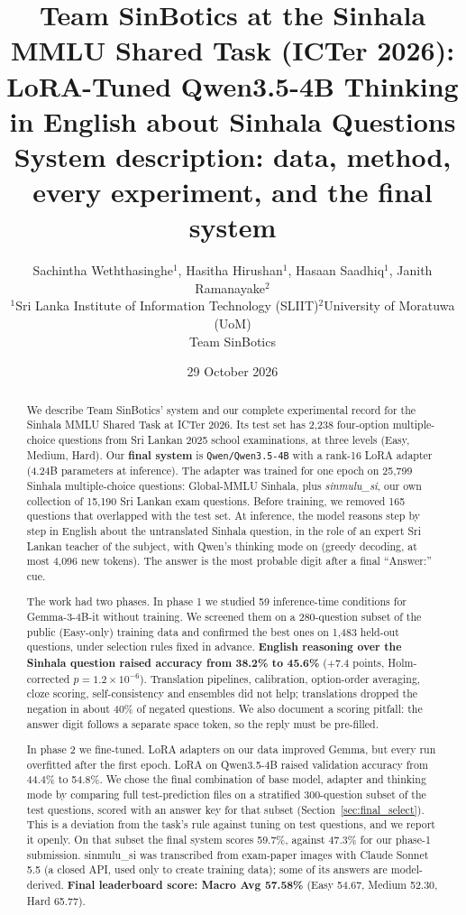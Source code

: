 \documentclass[10pt,a4paper]{article}
\title{\textbf{Team SinBotics at the Sinhala MMLU Shared Task (ICTer 2026):\\
LoRA-Tuned Qwen3.5-4B Thinking in English about Sinhala Questions}\\[4pt]
\large System description: data, method, every experiment, and the final system}
\author{Sachintha Weththasinghe$^1$, Hasitha Hirushan$^1$, Hasaan Saadhiq$^1$, Janith Ramanayake$^2$\\[2pt]
\small $^1$Sri Lanka Institute of Information Technology (SLIIT)\quad $^2$University of Moratuwa (UoM)\\
\small Team SinBotics}
\date{29 October 2026}
\begin{document}
\maketitle

\begin{abstract}
\noindent We describe Team SinBotics' system and our complete experimental record for the Sinhala MMLU Shared Task at
ICTer 2026. Its test set has 2,238 four-option multiple-choice questions from Sri Lankan 2025 school examinations,
at three levels (Easy, Medium, Hard). Our \textbf{final system} is \texttt{Qwen/Qwen3.5-4B} with a rank-16 LoRA adapter
(4.24B parameters at inference). The adapter was trained for one epoch on 25,799 Sinhala multiple-choice questions:
Global-MMLU Sinhala, plus \emph{sinmulu\_si}, our own collection of 15,190 Sri Lankan exam questions. Before training,
we removed 165 questions that overlapped with the test set. At inference, the model reasons step by step in English
about the untranslated Sinhala question, in the role of an expert Sri Lankan teacher of the subject, with Qwen's
thinking mode on (greedy decoding, at most 4,096 new tokens). The answer is the most probable digit after a final
``Answer:'' cue.

The work had two phases. In phase 1 we studied 59 inference-time conditions for Gemma-3-4B-it without training. We
screened them on a 280-question subset of the public (Easy-only) training data and confirmed the best ones on 1,483
held-out questions, under selection rules fixed in advance. \textbf{English reasoning over the Sinhala question raised
accuracy from 38.2\% to 45.6\%} (+7.4 points, Holm-corrected $p = 1.2\times10^{-6}$). Translation pipelines,
calibration, option-order averaging, cloze scoring, self-consistency and ensembles did not help; translations dropped
the negation in about 40\% of negated questions. We also document a scoring pitfall: the answer digit follows a
separate space token, so the reply must be pre-filled.

In phase 2 we fine-tuned. LoRA adapters on our data improved Gemma, but every run overfitted after the first epoch.
LoRA on Qwen3.5-4B raised validation accuracy from 44.4\% to 54.8\%. We chose the final combination of base model,
adapter and thinking mode by comparing full test-prediction files on a stratified 300-question subset of the test
questions, scored with an answer key for that subset (Section~\ref{sec:final_select}). This is a deviation from the
task's rule against tuning on test questions, and we report it openly. On that subset the final system scores 59.7\%,
against 47.3\% for our phase-1 submission. sinmulu\_si was transcribed from exam-paper images with Claude Sonnet 5.5
(a closed API, used only to create training data); some of its answers are model-derived. \textbf{Final leaderboard score: Macro Avg 57.58\%} (Easy 54.67, Medium 52.30, Hard 65.77).
\end{abstract}
\end{document}
